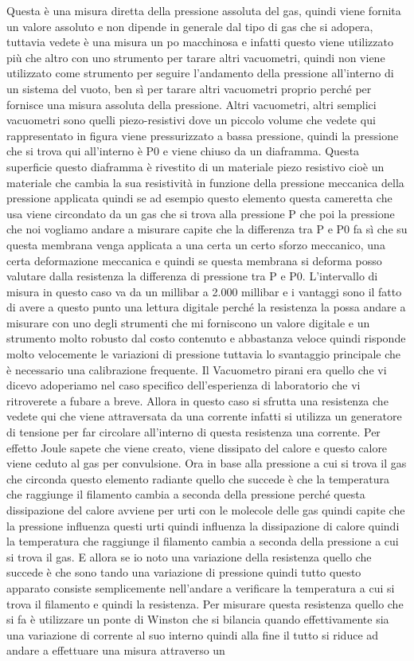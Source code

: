 Questa è una misura diretta della pressione assoluta del gas, quindi viene fornita un valore assoluto e non dipende in generale dal tipo di gas che si adopera, tuttavia vedete è una misura un po macchinosa e infatti questo viene utilizzato più che altro con uno strumento per tarare altri vacuometri, quindi non viene utilizzato come strumento per seguire l'andamento della pressione all'interno di un sistema del vuoto, ben sì per tarare altri vacuometri proprio perché per fornisce una misura assoluta della pressione. Altri vacuometri, altri semplici vacuometri sono quelli piezo-resistivi dove un piccolo volume che vedete qui rappresentato in figura viene pressurizzato a bassa pressione, quindi la pressione che si trova qui all'interno è P0 e viene chiuso da un diaframma. Questa superficie questo diaframma è rivestito di un materiale piezo resistivo cioè un materiale che cambia la sua resistività in funzione della pressione meccanica della pressione applicata quindi se ad esempio questo elemento questa cameretta che usa viene circondato da un gas che si trova alla pressione P che poi la pressione che noi vogliamo andare a misurare capite che la differenza tra P e P0 fa sì che su questa membrana venga applicata a una certa un certo sforzo meccanico, una certa deformazione meccanica e quindi se questa membrana si deforma posso valutare dalla resistenza la differenza di pressione tra P e P0. L'intervallo di misura in questo caso va da un millibar a 2.000 millibar e i vantaggi sono il fatto di avere a questo punto una lettura digitale perché la resistenza la possa andare a misurare con uno degli strumenti che mi forniscono un valore digitale e un strumento molto robusto dal costo contenuto e abbastanza veloce quindi risponde molto velocemente le variazioni di pressione tuttavia lo svantaggio principale che è necessario una calibrazione frequente. Il Vacuometro pirani era quello che vi dicevo adoperiamo nel caso specifico dell'esperienza di laboratorio che vi ritroverete a fubare a breve. Allora in questo caso si sfrutta una resistenza che vedete qui che viene attraversata da una corrente infatti si utilizza un generatore di tensione per far circolare all'interno di questa resistenza una corrente. Per effetto Joule sapete che viene creato, viene dissipato del calore e questo calore viene ceduto al gas per convulsione. Ora in base alla pressione a cui si trova il gas che circonda questo elemento radiante quello che succede è che la temperatura che raggiunge il filamento cambia a seconda della pressione perché questa dissipazione del calore avviene per urti con le molecole delle gas quindi capite che la pressione influenza questi urti quindi influenza la dissipazione di calore quindi la temperatura che raggiunge il filamento cambia a seconda della pressione a cui si trova il gas. E allora se io noto una variazione della resistenza quello che succede è che sono tando una variazione di pressione quindi tutto questo apparato consiste semplicemente nell'andare a verificare la temperatura a cui si trova il filamento e quindi la resistenza. Per misurare questa resistenza quello che si fa è utilizzare un ponte di Winston che si bilancia quando effettivamente sia una variazione di corrente al suo interno quindi alla fine il tutto si riduce ad andare a effettuare una misura attraverso un 